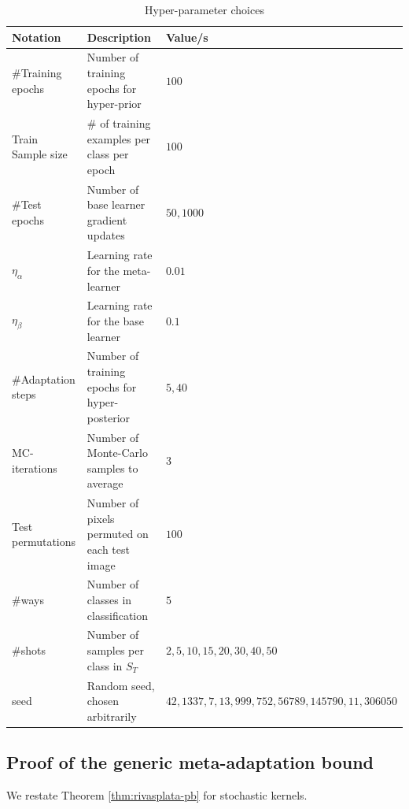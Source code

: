\documentclass[letterpaper]{article} %
\theoremstyle{definition}
\begin{document}
\begin{table}[ht]	
	
	\centering
	\begin{tabular}{lll}
		\toprule
		Notation   & Description  & Value/s   \\
		\midrule
		\#Training epochs & Number of training epochs for hyper-prior   & $100$      \\
		\midrule
		Train Sample size & \# of training examples per class per epoch   & $100$      \\
		\midrule
		\#Test epochs & Number of base learner gradient updates   & $50,1000$      \\
		\midrule
		$\eta_{\alpha}$  & Learning rate for the meta-learner   & $0.01$      \\
		\midrule
		$\eta_{\beta}$  & Learning rate for the base learner   & $0.1$      \\
		\midrule
		\#Adaptation steps  & Number of training epochs for hyper-posterior   & $5,40$      \\
		\midrule
		MC-iterations & Number of Monte-Carlo samples to average & $3$\\
		\midrule
		Test permutations  & Number of pixels permuted on each test image   & $100$      \\
		\midrule
		\#ways & Number of classes in classification & $5$\\
		\midrule
		\#shots & Number of samples per class in $S_T$ & $2,5,10,15,20,30,40,50$\\
		\midrule
		seed & Random seed, chosen arbitrarily & $42,1337,7,13,999,752,56789,145790,11,306050$\\
		\bottomrule
	\end{tabular}
	\caption{Hyper-parameter choices}
	\label{table:hyper-params}
\end{table}

\subsection{Proof of the generic meta-adaptation bound} \label{append:proof-main-result}

We restate Theorem \ref{thm:rivasplata-pb} for stochastic kernels. 
\end{document}
